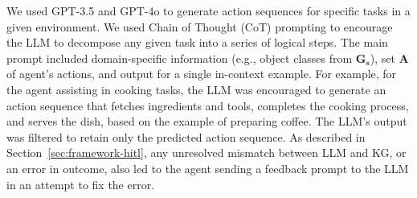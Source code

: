 We used GPT-3.5 and GPT-4o to generate action sequences for specific tasks in a given environment. We used Chain of Thought (CoT) prompting to encourage the LLM to decompose any given task into a series of logical steps. The main prompt included domain-specific information (e.g., object classes from $\mathbf{G_{s}}$), set $\mathbf{A}$ of agent's actions, and output for a single in-context example. For example, for the agent assisting in cooking tasks, the LLM was encouraged to generate an action sequence that fetches ingredients and tools, completes the cooking process, and serves the dish, based on the example of preparing coffee. %
The LLM's output was filtered to retain only the predicted action sequence.
As described in Section~\ref{sec:framework-hitl}, any unresolved mismatch between LLM and KG, or an error in outcome, also led to the agent sending a feedback prompt to the LLM in an attempt to fix the error.





